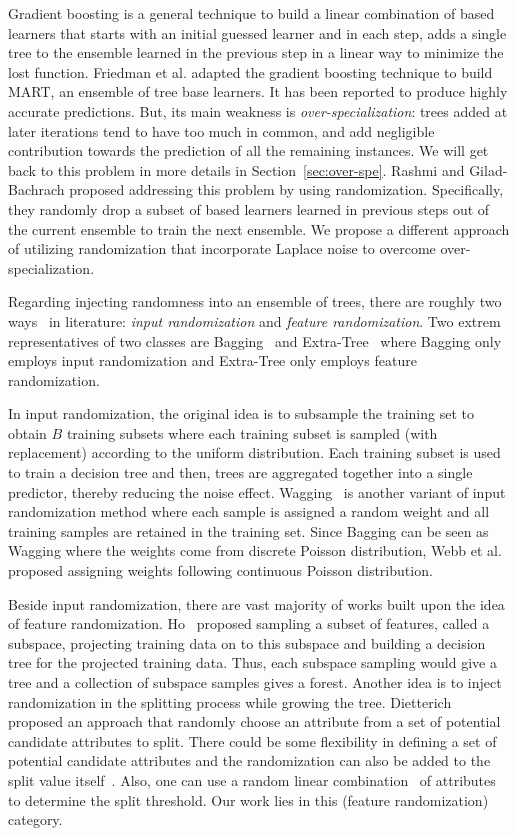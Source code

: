 \documentclass{article} %
\begin{document}
 Gradient boosting is a general technique to build a linear combination of based learners that starts with an initial guessed learner and in each step, adds a single tree to the ensemble learned in the previous step in a linear way to minimize the lost function.  Friedman et al.\cite{mart} adapted the gradient boosting technique to build MART, an ensemble of tree base learners. It has been reported\cite{Caruana06anempirical} to produce highly accurate predictions. But, its main weakness is \textit{over-specialization}:  trees added at later iterations tend to have too much in common, and add negligible contribution towards the prediction of all the remaining instances. We will get back to this problem in more details in Section~\ref{sec:over-spe}. Rashmi and Gilad-Bachrach proposed addressing this problem by using randomization. Specifically, they randomly drop a subset of based learners learned in previous steps out of the current ensemble to train the next ensemble. We propose a different approach of utilizing randomization that incorporate Laplace noise to overcome over-specialization.
 
Regarding injecting randomness into an ensemble of trees, there are roughly two ways~\cite{PV07} in literature: \emph{input randomization} and \emph{feature randomization}. Two extrem representatives of two classes are Bagging~\cite{Breiman96} and Extra-Tree~\cite{GEW06} where Bagging only employs input randomization and Extra-Tree only employs feature randomization.

In input randomization, the original idea is to subsample the training set to obtain $B$ training subsets where each training subset is sampled (with replacement) according to the uniform distribution.  Each training subset is used to train a decision tree and then, trees are aggregated together into a single predictor, thereby reducing the noise effect. Wagging~\cite{BK98} is another variant of input randomization method where each sample is assigned a random weight and all training samples are retained in the training set. Since Bagging can be seen as Wagging where the weights come from discrete Poisson distribution, Webb et al.~\cite{WZ04} proposed assigning weights following continuous Poisson distribution.  

Beside input randomization, there are vast majority of works built upon the idea of feature randomization. Ho~\cite{Ho98} proposed sampling a subset of features, called a subspace, projecting training data on to this subspace and building a decision tree for the projected training data. Thus, each subspace sampling would give a tree and a collection of subspace samples gives a forest. Another idea is to inject randomization in the splitting process while growing the tree. Dietterich~\cite{Dietterich00} proposed an approach that  randomly choose an attribute from a set of potential candidate attributes to split. There could be some flexibility in defining a set of potential candidate attributes and the randomization can also be added to the split value itself~\cite{CZ01,GEW06}. Also, one can use a random linear combination~\cite{Breiman2001} of attributes to determine the split threshold. Our work lies in this (feature randomization) category.
\end{document}
